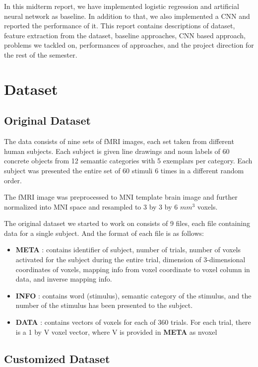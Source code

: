 \documentclass{article} %
\begin{document}
In this midterm report, we have implemented logistic regression and artificial neural network as baseline. In addition to that, we also implemented a CNN and reported the performance of it. This report contains descriptions of dataset, feature extraction from the dataset, baseline approaches, CNN based approach, problems we tackled on, performances of approaches, and the project direction for the rest of the semester.  
\newpage
\section{Dataset}

\subsection{Original Dataset}

The data consists of nine sets of fMRI images, each set taken from different human subjects. Each subject is given line drawings and noun labels of 60 concrete objects from 12 semantic categories with 5 exemplars per category. 
Each subject was presented the entire set of 60 stimuli 6 times in a different random order. 

The fMRI image was preprocessed to MNI template brain image and further normalized into MNI space and resampled to 3 by 3 by 6 $mm^3$ voxels.

The original dataset we started to work on consists of 9 files, each file containing data for a single subject. And the format of each file is as follows: \begin{itemize}
\item \textbf{META} : contains identifier of subject, number of trials, number of voxels activated for the subject during the entire trial, dimension of 3-dimensional coordinates of voxels, mapping info from voxel coordinate to voxel column in data, and inverse mapping info. 
\item \textbf{INFO} : contains word (stimulus), semantic category of the stimulus, and the number of the stimulus has been presented to the subject.
\item \textbf{DATA} : contains vectors of voxels for each of 360 trials. For each trial, there is a 1 by V voxel vector, where V is provided in \textbf{META} as nvoxel  \\
\end{itemize}

\subsection{Customized Dataset}
\end{document}
